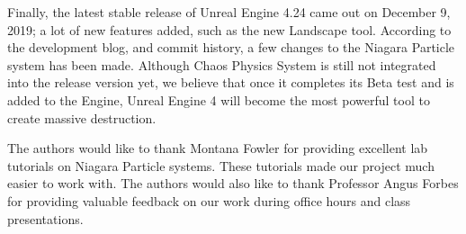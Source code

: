 \documentclass[sigconf]{acmart}
\begin{document}
Finally, the latest stable release of Unreal Engine 4.24 came out on December 9, 2019; a lot of new features added, such as the new Landscape tool. According to the development blog, and commit history, a few changes to the Niagara Particle system has been made. Although Chaos Physics System is still not integrated into the release version yet, we believe that once it completes its Beta test and is added to the Engine, Unreal Engine 4 will become the most powerful tool to create massive destruction. 



\begin{acks}
The authors would like to thank Montana Fowler for providing excellent lab tutorials on Niagara Particle systems. These tutorials made our project much easier to work with. The authors would also like to thank Professor Angus Forbes for providing valuable feedback on our work during office hours and class presentations. 
\end{acks}



\end{document}
